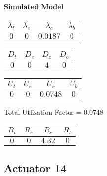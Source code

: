 \documentclass{article}
\begin{document}
\begin{minipage}{0.5\textwidth}
\centering	\textbf{Simulated Model}
\begin{table}[H]
\centering
\begin{tabular}{@{}cccc@{}}
\toprule
$\lambda_t$ & $\lambda_e$ & $\lambda_c$ & $\lambda_b$\\
\midrule
$0$ & $0$ & $0.0187$ & $0$\\
\bottomrule
\end{tabular}
\end{table}
\begin{table}[H]
\centering
\begin{tabular}{@{}cccc@{}}
\toprule
$D_t$ & $D_e$ & $D_c$ & $D_b$\\
\midrule
$0$ & $0$ & $4$ & $0$\\
\bottomrule
\end{tabular}
\end{table}\begin{table}[H]
\centering
\begin{tabular}{@{}cccc@{}}
\toprule
$U_t$ & $U_e$ & $U_c$ & $U_b$\\
\midrule
$0$ & $0$ & $0.0748$ & $0$\\
\bottomrule
\end{tabular}
\end{table}
\centering Total Utlization Factor = $0.0748$
\begin{table}[H]
\centering
\begin{tabular}{@{}cccc@{}}
\toprule
$R_t$ & $R_e$ & $R_c$ & $R_b$\\
\midrule
$0$ & $0$ & $4.32$ & $0$\\
\bottomrule
\end{tabular}
\end{table}
\end{minipage}\subsection{Actuator 14}
\end{document}
